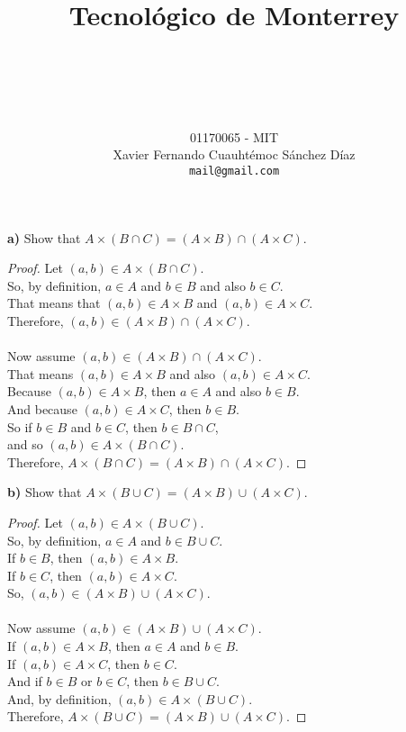 \documentclass[titlepage, letterpaper, fleqn]{article}
\title{
\vspace{1in}
\textbf{Tecnológico de Monterrey} \\
\vspace{0.5in}
\textmd{\mahclass} \\
\large{\textit{\mahteacher}} \\
\vspace{0.5in}
\textsc{\mahtitle}
\author{01170065  - MIT \\
Xavier Fernando Cuauhtémoc Sánchez Díaz \\
\texttt{mail@gmail.com}}
\date{\mahdate}
}
\newcommand{\spacepls}{\vspace{5mm}}
\begin{document}
\begin{titlepage}
\maketitle
\end{titlepage}

%
%

{\large \textbf{a)} Show that \(A \times (B \cap C) = (A \times B) \cap (A \times C)\).}

\begin{proof}
	Let \((a,b) \in A \times (B \cap C)\).\\
	So, by definition, \(a \in A\) and \(b \in B\) and also \(b \in C\).\\
	That means that \((a,b) \in A \times B\) and \((a,b) \in A \times C\).\\
	Therefore, \((a,b) \in (A \times B) \cap (A \times C)\).\\
	\\
	Now assume \((a,b) \in (A \times B) \cap (A \times C)\).\\
	That means \((a,b) \in A \times B\) and also \((a,b) \in A \times C\).\\
	Because \((a,b) \in A \times B\), then \(a \in A\) and also \(b \in B\).\\
	And because \((a,b) \in A \times C\), then \(b \in B\).\\
	So if \(b \in B\) and \(b \in C\), then \(b \in B \cap C\),\\
	and so \((a,b) \in A \times (B \cap C)\).\\
	Therefore, \(A \times (B \cap C) = (A \times B) \cap (A \times C)\).
\end{proof}

\spacepls

{\large \textbf{b)} Show that \(A \times (B \cup C) = (A \times B) \cup (A \times C)\).}

\begin{proof}
	Let \((a,b) \in A \times (B \cup C)\).\\
	So, by definition, \(a \in A\) and \(b \in B \cup C\).\\
	If \(b \in B\), then \((a,b) \in A \times B\).\\
	If \(b \in C\), then \((a,b) \in A \times C\).\\
	So, \((a,b) \in (A \times B) \cup (A \times C)\).\\
	\\
	Now assume \((a,b) \in (A \times B) \cup (A \times C)\).\\
	If \((a,b) \in A \times B\), then \(a \in A\) and \(b \in B\).\\
	If \((a,b) \in A \times C\), then \(b \in C\).\\
	And if \(b \in B\) or \(b \in C\), then \(b \in B \cup C\).\\
	And, by definition, \((a,b) \in A \times (B \cup C)\).\\
	Therefore, \(A \times (B \cup C) = (A \times B) \cup (A \times C)\).
\end{proof}
\end{document}
